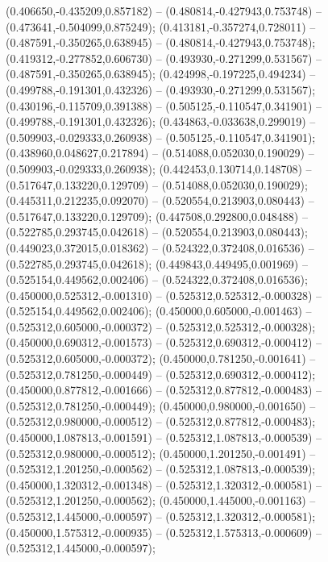  (0.406650,-0.435209,0.857182) -- (0.480814,-0.427943,0.753748) -- (0.473641,-0.504099,0.875249);
 (0.413181,-0.357274,0.728011) -- (0.487591,-0.350265,0.638945) -- (0.480814,-0.427943,0.753748);
 (0.419312,-0.277852,0.606730) -- (0.493930,-0.271299,0.531567) -- (0.487591,-0.350265,0.638945);
 (0.424998,-0.197225,0.494234) -- (0.499788,-0.191301,0.432326) -- (0.493930,-0.271299,0.531567);
 (0.430196,-0.115709,0.391388) -- (0.505125,-0.110547,0.341901) -- (0.499788,-0.191301,0.432326);
 (0.434863,-0.033638,0.299019) -- (0.509903,-0.029333,0.260938) -- (0.505125,-0.110547,0.341901);
 (0.438960,0.048627,0.217894) -- (0.514088,0.052030,0.190029) -- (0.509903,-0.029333,0.260938);
 (0.442453,0.130714,0.148708) -- (0.517647,0.133220,0.129709) -- (0.514088,0.052030,0.190029);
 (0.445311,0.212235,0.092070) -- (0.520554,0.213903,0.080443) -- (0.517647,0.133220,0.129709);
 (0.447508,0.292800,0.048488) -- (0.522785,0.293745,0.042618) -- (0.520554,0.213903,0.080443);
 (0.449023,0.372015,0.018362) -- (0.524322,0.372408,0.016536) -- (0.522785,0.293745,0.042618);
 (0.449843,0.449495,0.001969) -- (0.525154,0.449562,0.002406) -- (0.524322,0.372408,0.016536);
 (0.450000,0.525312,-0.001310) -- (0.525312,0.525312,-0.000328) -- (0.525154,0.449562,0.002406);
 (0.450000,0.605000,-0.001463) -- (0.525312,0.605000,-0.000372) -- (0.525312,0.525312,-0.000328);
 (0.450000,0.690312,-0.001573) -- (0.525312,0.690312,-0.000412) -- (0.525312,0.605000,-0.000372);
 (0.450000,0.781250,-0.001641) -- (0.525312,0.781250,-0.000449) -- (0.525312,0.690312,-0.000412);
 (0.450000,0.877812,-0.001666) -- (0.525312,0.877812,-0.000483) -- (0.525312,0.781250,-0.000449);
 (0.450000,0.980000,-0.001650) -- (0.525312,0.980000,-0.000512) -- (0.525312,0.877812,-0.000483);
 (0.450000,1.087813,-0.001591) -- (0.525312,1.087813,-0.000539) -- (0.525312,0.980000,-0.000512);
 (0.450000,1.201250,-0.001491) -- (0.525312,1.201250,-0.000562) -- (0.525312,1.087813,-0.000539);
 (0.450000,1.320312,-0.001348) -- (0.525312,1.320312,-0.000581) -- (0.525312,1.201250,-0.000562);
 (0.450000,1.445000,-0.001163) -- (0.525312,1.445000,-0.000597) -- (0.525312,1.320312,-0.000581);
 (0.450000,1.575312,-0.000935) -- (0.525312,1.575313,-0.000609) -- (0.525312,1.445000,-0.000597);
